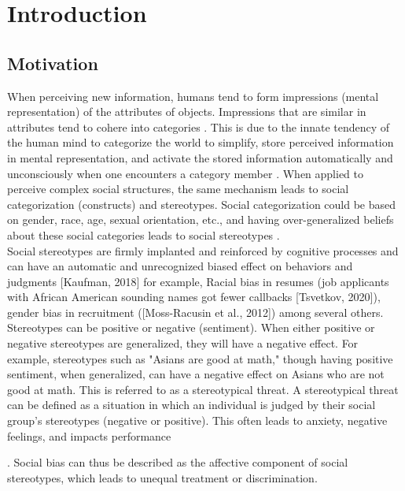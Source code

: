 \chapter{Introduction}
\section{Motivation}

When perceiving new information, humans tend to form impressions (mental representation) of the attributes of objects. Impressions that are similar in attributes tend to cohere into categories \cite{fiske1998stereotyping}\cite{allport1954nature}. This is due to the innate tendency of the human mind to categorize the world to simplify, store perceived information in mental representation, and activate the stored information automatically and unconsciously when one encounters
a category member \cite{ComputationalEthics}. When applied to perceive complex social structures, the same mechanism leads to social categorization (constructs) and stereotypes. Social categorization could be based on gender, race, age, sexual orientation, etc., and having over-generalized beliefs about these social categories leads to social stereotypes \cite{beukeboom2019stereotypes}\cite{ComputationalEthics}.	
\\

Social stereotypes are firmly implanted and reinforced by cognitive processes and can have
an automatic and unrecognized biased effect on behaviors and judgments [Kaufman, 2018]
for example, Racial bias in resumes (job applicants with African American sounding names
got fewer callbacks [Tsvetkov, 2020]), gender bias in recruitment ([Moss-Racusin et al., 2012])
among several others. Stereotypes can be positive or negative (sentiment). When either positive or negative stereotypes are generalized, they will have a negative effect. For example, stereotypes such as "Asians are good at math," though having positive sentiment, when generalized, can have a negative effect on Asians who are not good at math. This is referred to as a stereotypical threat. A stereotypical threat can be defined as a situation in which an individual is judged by their social group's stereotypes (negative or positive). This often leads to anxiety, negative feelings, and impacts performance 

\cite{beukeboom2019stereotypes}\cite{spencer2016stereotype}. Social
bias can thus be described as the affective component of social stereotypes, which leads to unequal treatment or
discrimination.
\\

